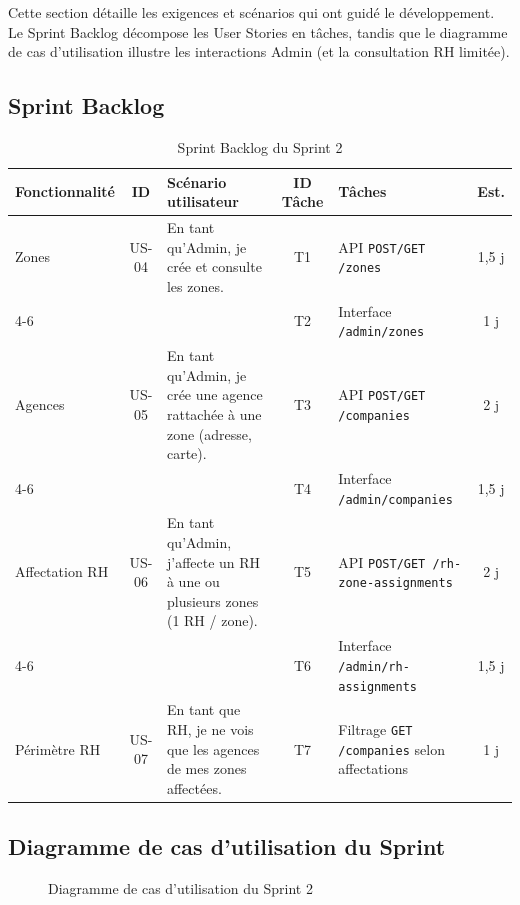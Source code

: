 Cette section détaille les exigences et scénarios qui ont guidé le
développement. Le Sprint Backlog décompose les User Stories en tâches,
tandis que le diagramme de cas d'utilisation illustre les interactions
Admin (et la consultation RH limitée).


\subsection{Sprint Backlog}

\begin{table}[htbp]
  \centering
  \scriptsize
  \caption{Sprint Backlog du Sprint 2}
  \label{tab:sprint2-backlog}
  \begin{tabular}{|p{2.2cm}|c|p{4.0cm}|c|p{3.3cm}|c|}
    \hline
    \textbf{Fonctionnalité} & \textbf{ID} & \textbf{Scénario utilisateur} &
    \textbf{ID Tâche} & \textbf{Tâches} & \textbf{Est.} \\
    \hline
    Zones
    & US-04
    & En tant qu'Admin, je crée et consulte les zones.
    & T1
    & API \texttt{POST/GET /zones}
    & 1,5 j \\
    \cline{4-6}
    & & & T2 & Interface \texttt{/admin/zones} & 1 j \\
    \hline
    Agences
    & US-05
    & En tant qu'Admin, je crée une agence rattachée à une zone (adresse, carte).
    & T3
    & API \texttt{POST/GET /companies}
    & 2 j \\
    \cline{4-6}
    & & & T4 & Interface \texttt{/admin/companies} & 1,5 j \\
    \hline
    Affectation RH
    & US-06
    & En tant qu'Admin, j'affecte un RH à une ou plusieurs zones (1 RH / zone).
    & T5
    & API \texttt{POST/GET /rh-zone-assignments}
    & 2 j \\
    \cline{4-6}
    & & & T6 & Interface \texttt{/admin/rh-assignments} & 1,5 j \\
    \hline
    Périmètre RH
    & US-07
    & En tant que RH, je ne vois que les agences de mes zones affectées.
    & T7
    & Filtrage \texttt{GET /companies} selon affectations
    & 1 j \\
    \hline
  \end{tabular}
\end{table}


\subsection{Diagramme de cas d'utilisation du Sprint}

\begin{figure}[H]
  \centering
  \caption{Diagramme de cas d'utilisation du Sprint 2}
  \label{fig:uc-sprint2}
\end{figure}


